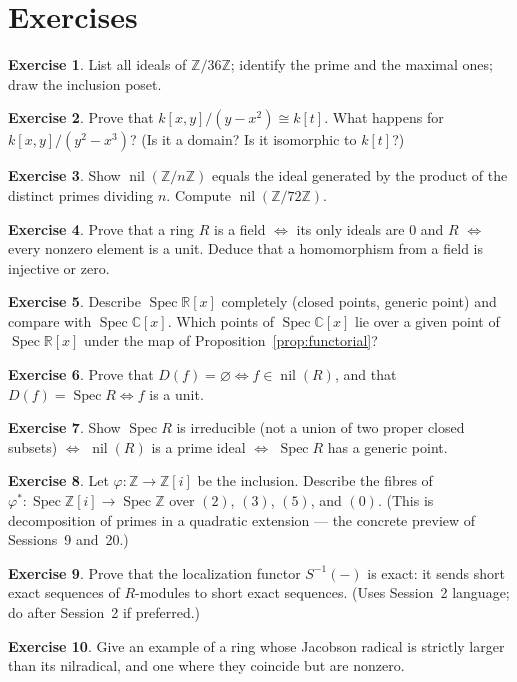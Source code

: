 \documentclass[11pt,a4paper]{article}
\theoremstyle{definition}
\newtheorem{exercise}{Exercise}
\newcommand{\Z}{\mathbb{Z}}
\newcommand{\R}{\mathbb{R}}
\newcommand{\C}{\mathbb{C}}
\newcommand{\Spec}{\operatorname{Spec}}
\newcommand{\nil}{\operatorname{nil}}
\begin{document}
	\section{Exercises}
	\begin{exercise}
		List all ideals of $\Z/36\Z$; identify the prime and the maximal ones; draw the inclusion poset.
	\end{exercise}
	\begin{exercise}
		Prove that $k[x,y]/(y-x^2)\cong k[t]$. What happens for $k[x,y]/(y^2-x^3)$? (Is it a domain? Is it
		isomorphic to $k[t]$?)
	\end{exercise}
	\begin{exercise}
		Show $\nil(\Z/n\Z)$ equals the ideal generated by the product of the distinct primes dividing $n$.
		Compute $\nil(\Z/72\Z)$.
	\end{exercise}
	\begin{exercise}
		Prove that a ring $R$ is a field $\iff$ its only ideals are $0$ and $R$ $\iff$ every nonzero element
		is a unit. Deduce that a homomorphism from a field is injective or zero.
	\end{exercise}
	\begin{exercise}
		Describe $\Spec\R[x]$ completely (closed points, generic point) and compare with $\Spec\C[x]$.
		Which points of $\Spec\C[x]$ lie over a given point of $\Spec\R[x]$ under the map of
		Proposition~\ref{prop:functorial}?
	\end{exercise}
	\begin{exercise}
		Prove that $D(f)=\varnothing\iff f\in\nil(R)$, and that $D(f)=\Spec R\iff f$ is a unit.
	\end{exercise}
	\begin{exercise}
		Show $\Spec R$ is irreducible (not a union of two proper closed subsets) $\iff$ $\nil(R)$ is a prime
		ideal $\iff$ $\Spec R$ has a generic point.
	\end{exercise}
	\begin{exercise}
		Let $\varphi:\Z\to\Z[i]$ be the inclusion. Describe the fibres of $\varphi^*:\Spec\Z[i]\to\Spec\Z$
		over $(2)$, $(3)$, $(5)$, and $(0)$. (This is decomposition of primes in a quadratic extension ---
		the concrete preview of Sessions~9 and~20.)
	\end{exercise}
	\begin{exercise}
		Prove that the localization functor $S^{-1}(-)$ is exact: it sends short exact sequences of
		$R$-modules to short exact sequences. (Uses Session~2 language; do after Session~2 if preferred.)
	\end{exercise}
	\begin{exercise}
		Give an example of a ring whose Jacobson radical is strictly larger than its nilradical, and one
		where they coincide but are nonzero.
	\end{exercise}
	
\end{document}
